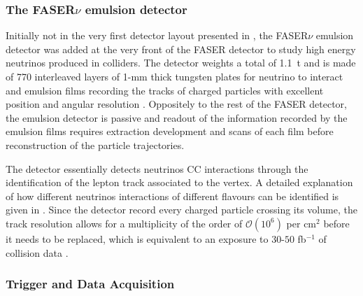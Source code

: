 			 \subsubsection{The FASER$\nu$ emulsion detector}
			 Initially not in the very first detector layout presented in \cite{FASER_loi, FASER_techprop}, the FASER$\nu$ emulsion detector was added at the very front of the FASER detector to study high energy neutrinos produced in colliders. The detector weights a total of \SI{1.1}{\tonne} and is made of 770 interleaved layers of 1-mm thick tungsten plates for neutrino to interact and emulsion films recording the tracks of charged particles  with excellent position and angular resolution \cite{FASER_Detector}. Oppositely to the rest of the FASER detector, the emulsion detector is passive and readout of the information recorded by the emulsion films requires extraction development and scans of each film before reconstruction of the particle trajectories. 
			 
			 The detector essentially detects neutrinos CC interactions through the identification of the lepton track associated to the vertex. A detailed explanation of how different neutrinos interactions of different flavours can be identified is given in \cite{FASER_Detector}. Since the detector record every charged particle crossing its volume, the track resolution allows for a multiplicity of the order of $\mathcal{O}(10^6)$ per cm$^2$ before it needs to be replaced, which is equivalent to an exposure to $30$-$50$ fb$^{-1}$ of collision data \cite{FASER_Detector}. 
			 
			 \subsubsection{Trigger and Data Acquisition}
			 

